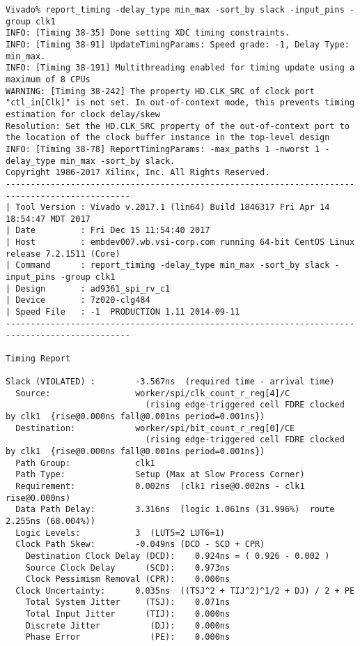 \documentclass{article}
\begin{document}
\begin{lstlisting}
Vivado% report_timing -delay_type min_max -sort_by slack -input_pins -group clk1
INFO: [Timing 38-35] Done setting XDC timing constraints.
INFO: [Timing 38-91] UpdateTimingParams: Speed grade: -1, Delay Type: min_max.
INFO: [Timing 38-191] Multithreading enabled for timing update using a maximum of 8 CPUs
WARNING: [Timing 38-242] The property HD.CLK_SRC of clock port "ctl_in[Clk]" is not set. In out-of-context mode, this prevents timing estimation for clock delay/skew
Resolution: Set the HD.CLK_SRC property of the out-of-context port to the location of the clock buffer instance in the top-level design
INFO: [Timing 38-78] ReportTimingParams: -max_paths 1 -nworst 1 -delay_type min_max -sort_by slack.
Copyright 1986-2017 Xilinx, Inc. All Rights Reserved.
-----------------------------------------------------------------------------------------------
| Tool Version : Vivado v.2017.1 (lin64) Build 1846317 Fri Apr 14 18:54:47 MDT 2017
| Date         : Fri Dec 15 11:54:40 2017
| Host         : embdev007.wb.vsi-corp.com running 64-bit CentOS Linux release 7.2.1511 (Core)
| Command      : report_timing -delay_type min_max -sort_by slack -input_pins -group clk1
| Design       : ad9361_spi_rv_c1
| Device       : 7z020-clg484
| Speed File   : -1  PRODUCTION 1.11 2014-09-11
-----------------------------------------------------------------------------------------------

Timing Report

Slack (VIOLATED) :        -3.567ns  (required time - arrival time)
  Source:                 worker/spi/clk_count_r_reg[4]/C
                            (rising edge-triggered cell FDRE clocked by clk1  {rise@0.000ns fall@0.001ns period=0.001ns})
  Destination:            worker/spi/bit_count_r_reg[0]/CE
                            (rising edge-triggered cell FDRE clocked by clk1  {rise@0.000ns fall@0.001ns period=0.001ns})
  Path Group:             clk1
  Path Type:              Setup (Max at Slow Process Corner)
  Requirement:            0.002ns  (clk1 rise@0.002ns - clk1 rise@0.000ns)
  Data Path Delay:        3.316ns  (logic 1.061ns (31.996%)  route 2.255ns (68.004%))
  Logic Levels:           3  (LUT5=2 LUT6=1)
  Clock Path Skew:        -0.049ns (DCD - SCD + CPR)
    Destination Clock Delay (DCD):    0.924ns = ( 0.926 - 0.002 ) 
    Source Clock Delay      (SCD):    0.973ns
    Clock Pessimism Removal (CPR):    0.000ns
  Clock Uncertainty:      0.035ns  ((TSJ^2 + TIJ^2)^1/2 + DJ) / 2 + PE
    Total System Jitter     (TSJ):    0.071ns
    Total Input Jitter      (TIJ):    0.000ns
    Discrete Jitter          (DJ):    0.000ns
    Phase Error              (PE):    0.000ns


\end{lstlisting}
\end{document}
